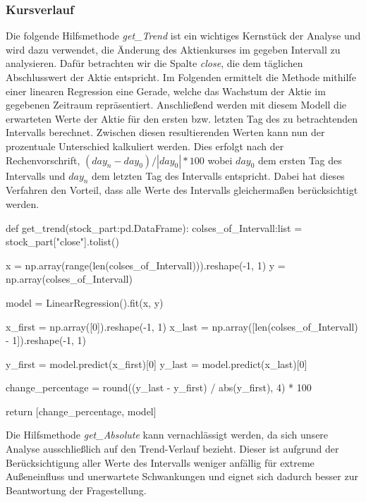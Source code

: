 \documentclass{article}
\begin{document}
\subsubsection{Kursverlauf} \label{Kursverlauf}
Die folgende Hilfsmethode \textit{get\_Trend} ist ein wichtiges Kernstück der Analyse und wird dazu verwendet, die Änderung des Aktienkurses im gegeben Intervall zu analysieren.
Dafür betrachten wir die Spalte \textit{close}, die dem täglichen Abschlusswert der Aktie entspricht.
Im Folgenden ermittelt die Methode mithilfe einer linearen Regression eine Gerade, welche das Wachstum der Aktie im gegebenen Zeitraum repräsentiert.
Anschließend werden mit diesem Modell die erwarteten Werte der Aktie für den ersten bzw. letzten Tag des zu betrachtenden Intervalls berechnet.
Zwischen diesen resultierenden Werten kann nun der prozentuale Unterschied kalkuliert werden.
Dies erfolgt nach der Rechenvorschrift, $ (day_{n} - day_{0}) / |day_{0}| * 100 $ wobei $day_{0}$ dem ersten Tag des Intervalls und $day_{n}$ dem letzten Tag des Intervalls entspricht. 
Dabei hat dieses Verfahren den Vorteil, dass alle Werte des Intervalls gleichermaßen berücksichtigt werden.

\newpage

\begin{python}
def get_trend(stock_part:pd.DataFrame):
    colses_of_Intervall:list = stock_part["close"].tolist()
    
    x = np.array(range(len(colses_of_Intervall))).reshape(-1, 1)
    y = np.array(colses_of_Intervall)

    model = LinearRegression().fit(x, y)

    x_first = np.array([0]).reshape(-1, 1)
    x_last = np.array([len(colses_of_Intervall) - 1]).reshape(-1, 1)

    y_first = model.predict(x_first)[0]
    y_last = model.predict(x_last)[0]

    change_percentage = round((y_last - y_first) / abs(y_first), 4) * 100

    return [change_percentage, model]
\end{python}
Die Hilfsmethode \textit{get\_Absolute} kann vernachlässigt werden, da sich unsere Analyse ausschließlich auf den Trend-Verlauf bezieht.
Dieser ist aufgrund der Berücksichtigung aller Werte des Intervalls weniger anfällig für extreme Außeneinfluss und unerwartete Schwankungen und eignet sich dadurch besser zur Beantwortung der Fragestellung.
\end{document}
